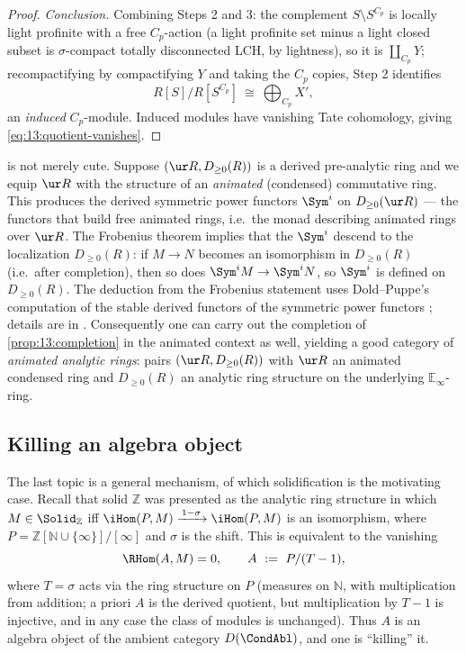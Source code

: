 \begin{proof}
\emph{Conclusion.} Combining Steps 2 and 3: the complement $S\setminus S^{C_p}$ is
locally light profinite with a free $C_p$-action (a light profinite set minus a
light closed subset is $\sigma$-compact totally disconnected LCH, by lightness),
so it is $\coprod_{C_p}Y$; recompactifying by compactifying $Y$ and taking the
$C_p$ copies, Step 2 identifies
\begin{equation*}
R[S]\big/R[S^{C_p}]\ \cong\ \bigoplus_{C_p} X',
\end{equation*}
an \emph{induced} $C_p$-module. Induced modules have vanishing Tate cohomology,
giving \eqref{eq:13:quotient-vanishes}.
\end{proof}

\begin{remark}
\label{rmk:13:symmetric-powers}
 is not merely cute. Suppose $(\ur R,D_{\ge 0}(R))$ is a
derived pre-analytic ring and we equip $\ur R$ with the structure of an
\emph{animated} (condensed) commutative ring. This produces the derived symmetric
power functors $\Sym^i$ on $D_{\ge 0}(\ur R)$ --- the functors that build free
animated rings, i.e.\ the monad describing animated rings over $\ur R$. The
Frobenius theorem implies that the $\Sym^i$ descend to the localization
$D_{\ge 0}(R)$: if $M\to N$ becomes an isomorphism in $D_{\ge 0}(R)$ (i.e.\ after
completion), then so does $\Sym^i M\to\Sym^i N$, so $\Sym^i$ is defined on
$D_{\ge 0}(R)$. The deduction from the Frobenius statement uses Dold--Puppe's
computation of the stable derived functors of the symmetric power functors
\cite{Dold_1961}; details are in \cite{clausen2020analytic}. Consequently one can
carry out the completion of \cref{prop:13:completion} in the animated context as
well, yielding a good category of \emph{animated analytic rings}: pairs
$(\ur R,D_{\ge 0}(R))$ with $\ur R$ an animated condensed ring and $D_{\ge 0}(R)$
an analytic ring structure on the underlying $\mathbb{E}_\infty$-ring.
\end{remark}

\subsection{Killing an algebra object}

The last topic is a general mechanism, of which solidification is the motivating
case. Recall that solid $\mathbb Z$ was presented as the analytic ring structure
in which $M\in\Solid_{\mathbb Z}$ iff
$\iHom(P,M)\xrightarrow{\,1-\sigma\,}\iHom(P,M)$ is an isomorphism, where
$P=\mathbb Z[\mathbb N\cup\{\infty\}]/[\infty]$ and $\sigma$ is the shift. This is
equivalent to the vanishing
\begin{equation*}
\RHom(A,M)=0,\qquad A\ :=\ P/(T-1),
\end{equation*}
where $T=\sigma$ acts via the ring structure on $P$ (measures on $\mathbb N$, with
multiplication from addition; a priori $A$ is the derived quotient, but
multiplication by $T-1$ is injective, and in any case the class of modules is
unchanged). Thus $A$ is an algebra object of the ambient category
$D(\CondAbl)$, and one is ``killing'' it.

